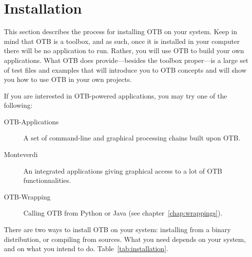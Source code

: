 \chapter{Installation}
\label{chapter:Installation}

This section describes the process for installing OTB on your system. Keep in
mind that OTB is a toolbox, and as such, once it is installed in your computer
there will be no application to run. Rather, you will use OTB to build your
own applications. What OTB does provide---besides the toolbox proper---is a
large set of test files and examples that will introduce you to OTB concepts
and will show you how to use OTB in your own projects.

If you are interested in OTB-powered applications, you may try one of the following:
\begin{description}
\item[OTB-Applications]{A set of command-line and graphical processing chains built
upon OTB.}
\item [Monteverdi]{An integrated applications giving graphical access to a lot of OTB 
functionnalities.}
\item[OTB-Wrapping]{Calling OTB from Python or Java (see chapter~\ref{chap:wrappings}).}
\end{description}

There are two ways to install OTB on your system: installing from a binary distribution,
or compiling from sources. What you need depends on your system, and on what you
intend to do. Table~\ref{tab:installation}.

